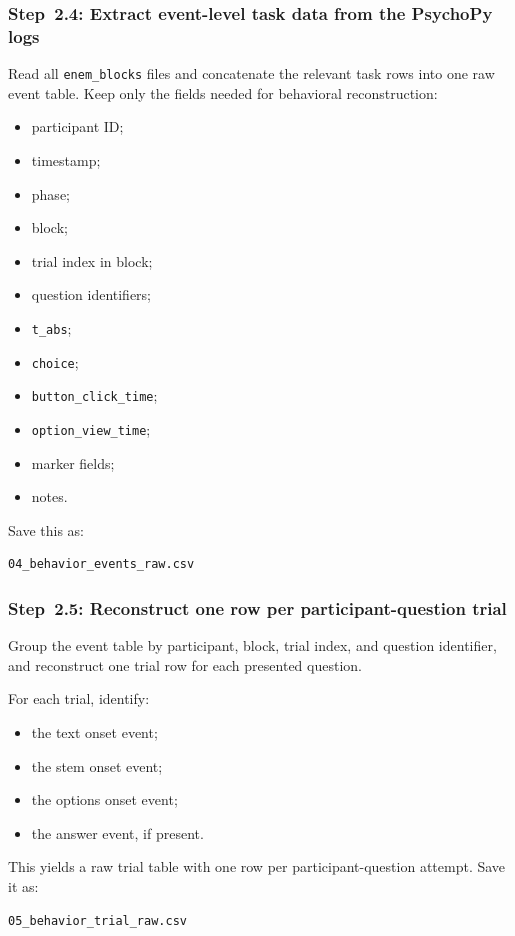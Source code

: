 \documentclass[11pt]{article}
\begin{document}
\subsubsection{Step~2.4: Extract event-level task data from the PsychoPy logs}
Read all \texttt{enem\_blocks} files and concatenate the relevant task rows into one raw event table.
Keep only the fields needed for behavioral reconstruction:
\begin{itemize}
    \item participant ID;
    \item timestamp;
    \item phase;
    \item block;
    \item trial index in block;
    \item question identifiers;
    \item \texttt{t\_abs};
    \item \texttt{choice};
    \item \texttt{button\_click\_time};
    \item \texttt{option\_view\_time};
    \item marker fields;
    \item notes.
\end{itemize}

Save this as:
\begin{verbatim}
04_behavior_events_raw.csv
\end{verbatim}

\subsubsection{Step~2.5: Reconstruct one row per participant-question trial}
Group the event table by participant, block, trial index, and question identifier, and reconstruct one trial row for each presented question.

For each trial, identify:
\begin{itemize}
    \item the text onset event;
    \item the stem onset event;
    \item the options onset event;
    \item the answer event, if present.
\end{itemize}

This yields a raw trial table with one row per participant-question attempt.
Save it as:
\begin{verbatim}
05_behavior_trial_raw.csv
\end{verbatim}
\end{document}
